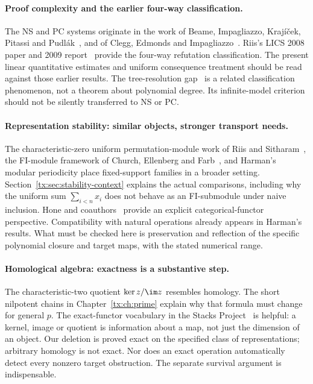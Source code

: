 \documentclass[11pt,a4paper,oneside,openany]{book}
\theoremstyle{definition}\newtheorem{definition}[theorem]{Definition}
\theoremstyle{remark}\newtheorem{remark}[theorem]{Remark}
\numberwithin{equation}{chapter}
\begin{document}
\paragraph{Proof complexity and the earlier four-way classification.}
The NS and PC systems originate in the work of Beame, Impagliazzo,
Kraj\'i\v cek, Pitassi and Pudl\'ak~\cite{NSFoundations}, and of Clegg,
Edmonds and Impagliazzo~\cite{PCFoundations}. Riis's LICS 2008 paper
and 2009 report~\cite{Riis,RiisLong} provide the four-way refutation
classification. The present linear quantitative estimates and uniform
consequence treatment should be read against those earlier results.
The tree-resolution gap~\cite{RiisTree} is a related classification
phenomenon, not a theorem about polynomial degree. Its infinite-model
criterion should not be silently transferred to NS or PC.

\paragraph{Representation stability: similar objects, stronger transport needs.}
The characteristic-zero uniform permutation-module work of Riis and
Sitharam~\cite{RiisSitharamModules}, the FI-module framework of Church,
Ellenberg and Farb~\cite{CEF}, and Harman's modular periodicity
\cite{Harman} place fixed-support families in a broader setting.
Section~\ref{tx:sec:stability-context} explains the actual comparisons,
including why the uniform sum $\sum_{i<n}x_i$ does not behave as an
FI-submodule under naive inclusion. Hone and coauthors~\cite{HKPSYZ}
provide an explicit categorical-functor perspective. Compatibility with
natural operations already appears in Harman's results. What must be
checked here is preservation and reflection of the specific polynomial
closure and target maps, with the stated numerical range.

\paragraph{Homological algebra: exactness is a substantive step.}
The characteristic-two quotient $\ker z/\im z$ resembles homology.
The short nilpotent chains in Chapter~\ref{tx:ch:prime} explain why
that formula must change for general $p$. The exact-functor vocabulary
in the Stacks Project~\cite{StacksExact} is helpful: a kernel, image or
quotient is information about a map, not just the dimension of an
object. Our deletion is proved exact on the specified class of
representations; arbitrary homology is not exact. Nor does an exact
operation automatically detect every nonzero target obstruction.
The separate survival argument is indispensable.
\end{document}

